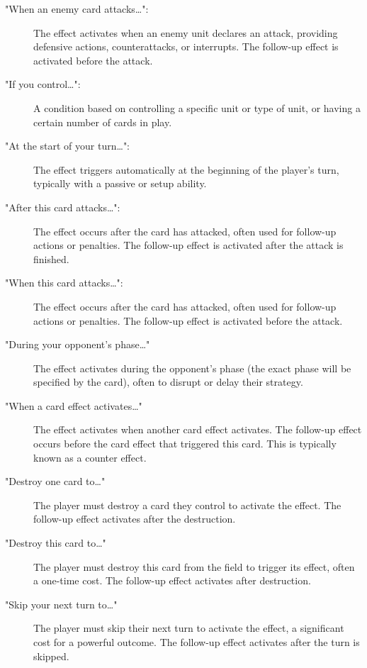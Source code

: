 \begin{description}
	\item["When an enemy card attacks\dots":] The effect activates when an enemy unit declares an attack, providing defensive actions, counterattacks, or interrupts. The follow-up effect is activated before the attack.
	\item["If you control\dots":] A condition based on controlling a specific unit or type of unit, or having a certain number of cards in play.
	\item["At the start of your turn\dots":] The effect triggers automatically at the beginning of the player's turn, typically with a passive or setup ability.
	\item["After this card attacks\dots":] The effect occurs after the card has attacked, often used for follow-up actions or penalties. The follow-up effect is activated after the attack is finished.
	\item["When this card attacks\dots":] The effect occurs after the card has attacked, often used for follow-up actions or penalties. The follow-up effect is activated before the attack.
	\item["During your opponent's phase\dots"]  The effect activates during the opponent's phase (the exact phase will be specified by the card), often to disrupt or delay their strategy.
	\item["When a card effect activates\dots"] The effect activates when another card effect activates. The follow-up effect occurs before the card effect that triggered this card. This is typically known as a counter effect.
	\item["Destroy one card to\dots"] The player must destroy a card they control to activate the effect. The follow-up effect activates after the destruction.
	\item["Destroy this card to\dots"] The player must destroy this card from the field to trigger its effect, often a one-time cost. The follow-up effect activates after destruction.
	\item["Skip your next turn to\dots"] The player must skip their next turn to activate the effect, a significant cost for a powerful outcome. The follow-up effect activates after the turn is skipped. 
\end{description}

    

  
  


